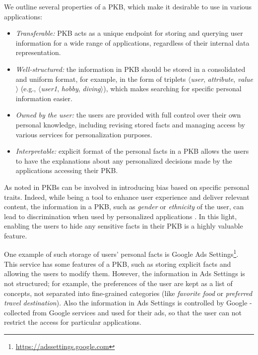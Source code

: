 We outline several properties of a PKB, which make it desirable to use in various applications:
\begin{itemize}
    \item \textit{Transferable:} PKB acts as a unique endpoint for storing and querying user information for a wide range of applications, regardless of their internal data representation.
    \item \textit{Well-structured:} the information in PKB should be stored in a consolidated and uniform format, for example, in the form of triplets $\langle$\textit{user}, \textit{attribute}, \textit{value}$\rangle$ (e.g., $\langle$\textit{user1}, \textit{hobby}, \textit{diving}$\rangle$), which makes searching for specific personal information easier.
    \item \textit{Owned by the user:} the users are provided with full control over their own personal knowledge, including revising stored facts and managing access by various services for personalization purposes.
    \item \textit{Interpretable:} explicit format of the personal facts in a PKB allows the users to have the explanations about any personalized decisions made by the applications accessing their PKB.
\end{itemize}

As noted in \citet{gerritse2020bias} PKBs can be involved in introducing bias based on specific personal traits. Indeed, while being a tool to enhance user experience and deliver relevant content, the information in a PKB, such as \textit{gender} or \textit{ethnicity} of the user, can lead to discrimination when used by personalized applications \cite{datta2015automated,  ali2019discrimination}. In this light, enabling the users to hide any sensitive facts in their PKB is a highly valuable feature.

One example of such storage of users' personal facts is Google Ads Settings\footnote{\href{https://adssettings.google.com}{https://adssettings.google.com}}. This service has some features of a PKB, such as storing explicit facts and allowing the users to modify them. However, the information in Ads Settings is not structured; for example, the preferences of the user are kept as a list of concepts, not separated into fine-grained categories (like \textit{favorite food} or \textit{preferred travel destination}). Also the information in Ads Settings is controlled by Google - collected from Google services and used for their ads, so that the user can not restrict the access for particular applications. %

